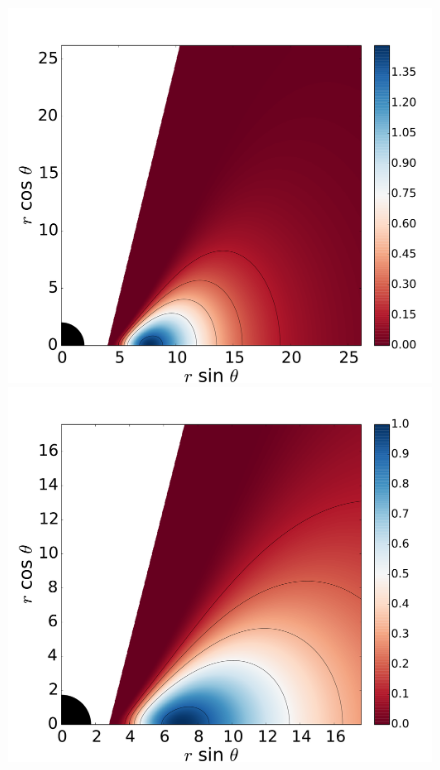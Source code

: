 \documentclass[twocolumn,aps,showpacs,showkeys,prd,superscriptaddress,byrevtex, amsmath]{revtex4-1}
\begin{document}
\begin{figure}
\includegraphics[scale=0.14]{figures/fig9_0__10.pdf}
\\
\includegraphics[scale=0.14]{figures/fig9_05_10.pdf}
\hspace{-0.3cm}

\end{figure}
\end{document}
